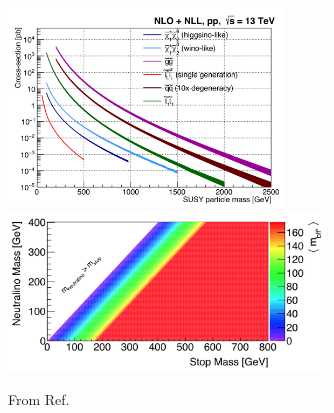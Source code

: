 \begin{figure}[!htb]
    \begin{center}
        \includegraphics[width=0.65\textwidth]{figures/search_stop2l/SUSY_xsec_13TeV_v1}
        \includegraphics[width=0.75\textwidth]{figures/search_stop2l/nachman_stop_phase_space}
        \caption{
            From Ref.~\cite{Nachman:2016qyc}
        }
        \label{fig:stop_phase_space}
    \end{center}
\end{figure}

%
%




%
%
%
%
%
%
%
%
%
